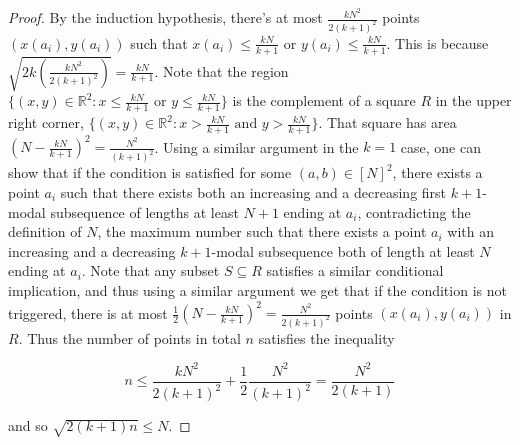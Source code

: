\documentclass[10pt,a4paper]{amsart}
\begin{document}
\begin{proof}
By the induction hypothesis, there's at most $\frac{kN^2}{2(k+1)^2}$ points $(x(a_i), y(a_i))$ such that $x(a_i) \leq \frac{kN}{k+1}$ or $y(a_i) \leq \frac{kN}{k+1}$. This is because $\sqrt{2k (\frac{kN^2}{2(k+1)^2})} = \frac{kN}{k+1}$. Note that the region $\{(x,y) \in \mathbb{R}^2 : x \leq \frac{kN}{k+1} \text{ or } y \leq \frac{kN}{k+1}\}$ is the complement of a square $R$ in the upper right corner, $\{(x,y) \in \mathbb{R}^2 : x > \frac{kN}{k+1} \text{ and } y > \frac{kN}{k+1}\}$. That square has area $(N - \frac{kN}{k+1})^2 = \frac{N^2}{(k+1)^2}$. Using a similar argument in the $k=1$ case, one can show that if the condition is satisfied for some $(a,b) \in [N]^2$, there exists a point $a_i$ such that there exists both an increasing and a decreasing first $k+1$-modal subsequence of lengths at least $N+1$ ending at $a_i$, contradicting the definition of $N$, the maximum number such that there exists a point $a_i$ with an increasing and a decreasing $k+1$-modal subsequence both of length at least $N$ ending at $a_i$. Note that any subset $S \subseteq R$ satisfies a similar conditional implication, and thus using a similar argument we get that if the condition is not triggered, there is at most $\frac{1}{2}(N - \frac{kN}{k+1})^2 = \frac{N^2}{2(k+1)^2}$ points $(x(a_i), y(a_i))$ in $R$. Thus the number of points in total $n$ satisfies the inequality

$$n \leq \frac{kN^2}{2(k+1)^2} + \frac{1}{2}\frac{N^2}{(k+1)^2} = \frac{N^2}{2(k+1)}$$

and so $\sqrt{2(k+1)n} \leq N$. 
\end{proof} 
\end{document}
